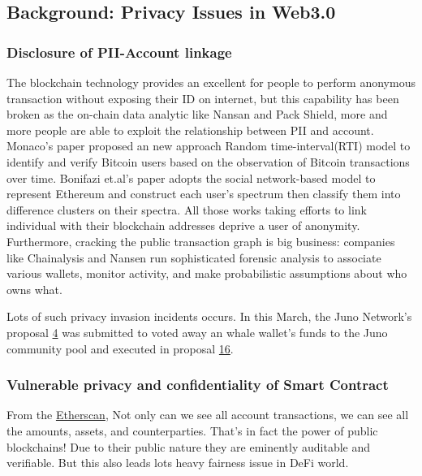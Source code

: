 \documentclass{article}
\begin{document}
\subsection{Background: Privacy Issues in Web3.0}

\subsubsection{Disclosure of PII-Account linkage}

The blockchain technology provides an excellent for people to perform anonymous transaction without exposing their ID on internet, but this capability has been broken as the on-chain data analytic like Nansan and Pack Shield, more and more people are able to exploit the relationship between PII and account. Monaco's paper \cite{monaco2015identifying} 
proposed an new approach Random time-interval(RTI) model to identify and verify Bitcoin users based on the observation of Bitcoin transactions over time.  Bonifazi et.al's paper \cite{bonifazi2022defining} adopts the social network-based model to represent Ethereum and construct each user's spectrum then classify them into difference clusters on their spectra.  All those works taking efforts to link individual with their blockchain addresses deprive a user of anonymity. Furthermore, cracking the public transaction graph is big business: companies like Chainalysis and Nansen run sophisticated forensic analysis to associate various wallets, monitor activity, and make probabilistic assumptions about who owns what.

Lots of such privacy invasion incidents occurs. In this March, the Juno Network's proposal \href{https://www.mintscan.io/juno/proposals/4}{4} was submitted to voted away an whale wallet's funds to the Juno community pool and executed in proposal \href{https://www.mintscan.io/juno/proposals/16}{16}.  

\subsubsection{Vulnerable privacy and confidentiality of Smart Contract}

From the \href{etherscan.io}{Etherscan}, Not only can we see all account transactions, we can see all the amounts, assets, and counterparties. That’s in fact the power of public blockchains! Due to their public nature they are eminently auditable and verifiable. But this also leads lots heavy fairness issue in DeFi world. 
\end{document}
